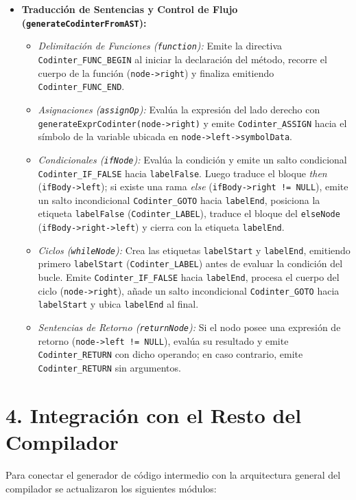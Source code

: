 \documentclass[12pt, a4paper]{article}
\begin{document}
\begin{itemize}
    \item \textbf{Traducción de Sentencias y Control de Flujo (\texttt{generateCodinterFromAST}):}
    \begin{itemize}
        \item \textit{Delimitación de Funciones (\texttt{function}):} Emite la directiva \texttt{Codinter\_FUNC\_BEGIN} al iniciar la declaración del método, recorre el cuerpo de la función (\texttt{node->right}) y finaliza emitiendo \texttt{Codinter\_FUNC\_END}.
        \item \textit{Asignaciones (\texttt{assignOp}):} Evalúa la expresión del lado derecho con \texttt{generateExprCodinter(node->right)} y emite \texttt{Codinter\_ASSIGN} hacia el símbolo de la variable ubicada en \texttt{node->left->symbolData}.
        \item \textit{Condicionales (\texttt{ifNode}):} Evalúa la condición y emite un salto condicional \texttt{Codinter\_IF\_FALSE} hacia \texttt{labelFalse}. Luego traduce el bloque \textit{then} (\texttt{ifBody->left}); si existe una rama \textit{else} (\texttt{ifBody->right != NULL}), emite un salto incondicional \texttt{Codinter\_GOTO} hacia \texttt{labelEnd}, posiciona la etiqueta \texttt{labelFalse} (\texttt{Codinter\_LABEL}), traduce el bloque del \texttt{elseNode} (\texttt{ifBody->right->left}) y cierra con la etiqueta \texttt{labelEnd}.
        \item \textit{Ciclos (\texttt{whileNode}):} Crea las etiquetas \texttt{labelStart} y \texttt{labelEnd}, emitiendo primero \texttt{labelStart} (\texttt{Codinter\_LABEL}) antes de evaluar la condición del bucle. Emite \texttt{Codinter\_IF\_FALSE} hacia \texttt{labelEnd}, procesa el cuerpo del ciclo (\texttt{node->right}), añade un salto incondicional \texttt{Codinter\_GOTO} hacia \texttt{labelStart} y ubica \texttt{labelEnd} al final.
        \item \textit{Sentencias de Retorno (\texttt{returnNode}):} Si el nodo posee una expresión de retorno (\texttt{node->left != NULL}), evalúa su resultado y emite \texttt{Codinter\_RETURN} con dicho operando; en caso contrario, emite \texttt{Codinter\_RETURN} sin argumentos.
    \end{itemize}

\end{itemize}

\section{4. Integración con el Resto del Compilador}
Para conectar el generador de código intermedio con la arquitectura general del compilador se actualizaron los siguientes módulos:
\end{document}
